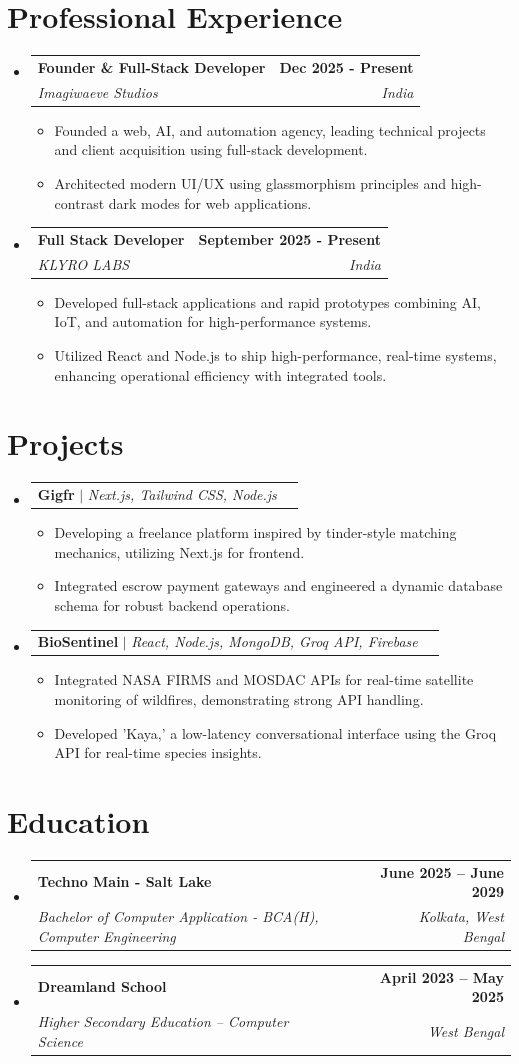 \documentclass[letterpaper,11pt]{article}
\makeatletter
\newcommand{\resumeItem}[1]{\item\small{{#1 \vspace{-2pt}}}}
\newcommand{\resumeSubheading}[4]{\vspace{-2pt}\item\begin{tabular*}{1.0\textwidth}[t]{l@{\extracolsep{\fill}}r}\textbf{#1} & \textbf{\small #2} \\\textit{\small#3} & \textit{\small #4} \\\end{tabular*}\vspace{-7pt}}
\newcommand{\resumeProjectHeading}[2]{\item\begin{tabular*}{1.001\textwidth}{l@{\extracolsep{\fill}}r}\small#1 & \textbf{\small #2}\\\end{tabular*}\vspace{-7pt}}
\newcommand{\resumeSubHeadingListStart}{\begin{itemize}[leftmargin=0.0in, label={}]}
\newcommand{\resumeSubHeadingListEnd}{\end{itemize}}
\newcommand{\resumeItemListStart}{\begin{itemize}}
\newcommand{\resumeItemListEnd}{\end{itemize}\vspace{-5pt}}
\makeatother
\begin{document}
\section{Professional Experience}
  \resumeSubHeadingListStart
\resumeSubheading{Founder \& Full-Stack Developer}{Dec 2025 - Present}{Imagiwaeve Studios}{India}
\resumeItemListStart
\resumeItem{Founded a web, AI, and automation agency, leading technical projects and client acquisition using full-stack development.}
\resumeItem{Architected modern UI/UX using glassmorphism principles and high-contrast dark modes for web applications.}
\resumeItemListEnd
\resumeSubheading{Full Stack Developer}{September 2025 - Present}{KLYRO LABS}{India}
\resumeItemListStart
\resumeItem{Developed full-stack applications and rapid prototypes combining AI, IoT, and automation for high-performance systems.}
\resumeItem{Utilized React and Node.js to ship high-performance, real-time systems, enhancing operational efficiency with integrated tools.}
\resumeItemListEnd
  \resumeSubHeadingListEnd
\vspace{-16pt}

\section{Projects}
\resumeSubHeadingListStart
\resumeProjectHeading{\textbf{Gigfr} $|$ \footnotesize\textit{Next.js, Tailwind CSS, Node.js}}{}
\resumeItemListStart
\resumeItem{Developing a freelance platform inspired by tinder-style matching mechanics, utilizing Next.js for frontend.}
\resumeItem{Integrated escrow payment gateways and engineered a dynamic database schema for robust backend operations.}
\resumeItemListEnd
\resumeProjectHeading{\textbf{BioSentinel} $|$ \footnotesize\textit{React, Node.js, MongoDB, Groq API, Firebase}}{}
\resumeItemListStart
\resumeItem{Integrated NASA FIRMS and MOSDAC APIs for real-time satellite monitoring of wildfires, demonstrating strong API handling.}
\resumeItem{Developed 'Kaya,' a low-latency conversational interface using the Groq API for real-time species insights.}
\resumeItemListEnd
\resumeSubHeadingListEnd

\section{Education}
  \resumeSubHeadingListStart
    \resumeSubheading
      {Techno Main - Salt Lake}{June 2025 -- June 2029}
      {Bachelor of Computer Application - BCA(H), Computer Engineering}{Kolkata, West Bengal}
    \resumeSubheading
      {Dreamland School}{April 2023 -- May 2025}
      {Higher Secondary Education -- Computer Science}{West Bengal}
  \resumeSubHeadingListEnd 
\vspace{-16pt}
\end{document}
